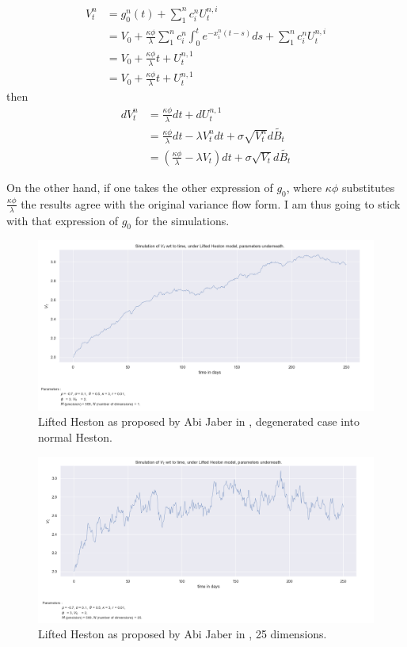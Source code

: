 \begin{align*}
V_t^n &= g_0^n (t) + \sum^n_1 c_i^n U_t^{n,i} \\
&= V_0 + \frac{ \kappa \phi} { \lambda } \sum_1^n c_i^n \int_0^t e^{-x_i^n (t-s) } ds 
+ \sum^n_1 c_i^n U_t^{n,i} \\
&= V_0 + \frac{ \kappa \phi} { \lambda } t
+ U_t^{n,1} \\
&= V_0 + \frac{ \kappa \phi} { \lambda } t + U_t^{n,1}
\end{align*}
then 
\begin{align*}
dV_t^n &= \frac{ \kappa \phi} { \lambda } dt + dU_t^{n,1} \\
&=  \frac{ \kappa \phi} { \lambda } dt - \lambda V_t^n dt + \sigma \sqrt{V_t^n}  d \widetilde{B_t} \\
&= ( \frac{ \kappa \phi} { \lambda } - \lambda V_t ) dt + \sigma \sqrt{V_t} d \widetilde{B_t}
\end{align*}

On the other hand, if one takes the other expression of $g_0$, where $\kappa \phi $ substitutes $\frac{ \kappa \phi} { \lambda }$ the results agree with the original variance flow form. I am thus going to stick with that expression of $g_0$ for the simulations.

\begin{figure}
\centering
\includegraphics[width = 0.8 \textwidth]{../addition_part/images/numerical_studies/Lifted_V_t.png}
\caption{Lifted Heston as proposed by Abi Jaber in \cite{lifted}, degenerated case into normal Heston.}
\label{fig:liftedV}
\end{figure}

\begin{figure}
\centering
\includegraphics[width = 0.8 \textwidth]{../addition_part/images/numerical_studies/Lifted_V_t_2.png}
\caption{Lifted Heston as proposed by Abi Jaber in \cite{lifted}, 25 dimensions.}
\label{fig:liftedV_2}
\end{figure}



